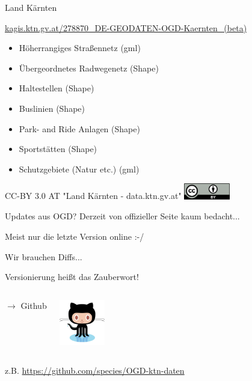 \documentclass{beamer}
\begin{document}
\begin{frame}{Land Kärnten}
	
	\href{http://www.kagis.ktn.gv.at/278870\_DE-GEODATEN-OGD-Kaernten\_(beta)}{kagis.ktn.gv.at/278870\_DE-GEODATEN-OGD-Kaernten\_(beta)}
	\begin{itemize}
		\item Höherrangiges Straßennetz (gml)
		\item Übergeordnetes Radwegenetz (Shape)
		\item Haltestellen (Shape)
		\item Buslinien (Shape)
		\item Park- and Ride Anlagen (Shape)
		\item Sportstätten (Shape)
		\item Schutzgebiete (Natur etc.) (gml)
	\end{itemize}
	\vspace{3mm}
	CC-BY 3.0 AT "Land Kärnten - data.ktn.gv.at" \hfill \includegraphics[width=2cm]{cc-by.png}
\end{frame}

\begin{frame}{Updates aus OGD?}
	Derzeit von offizieller Seite kaum bedacht...
	\pause

	\vspace{3mm}
	Meist nur die letzte Version online :-/

	\pause
	\vspace{3mm}
	Wir brauchen Diffs...

	\pause
	\vspace{3mm}
	Versionierung heißt das Zauberwort!

	\begin{columns}[c] 
		\begin{center}
			{\LARGE $\rightarrow$ Github}
		\end{center}
		\begin{center}
			\includegraphics[width=2cm]{github.jpg}
		\end{center}
	\end{columns}

	\vspace{3mm}
	z.B. \url{https://github.com/species/OGD-ktn-daten}

\end{frame}
\end{document}
